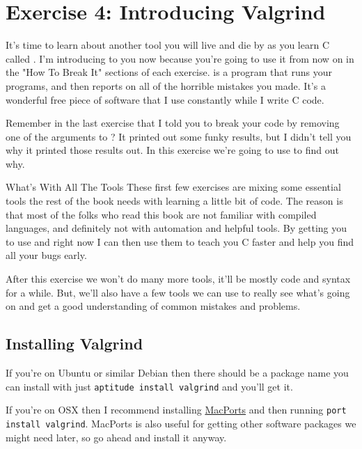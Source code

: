 \chapter{Exercise 4: Introducing Valgrind}

It's time to learn about another tool you will live and die by as you
learn C called .  I'm introducing  to you
now because you're going to use it from now on in the "How To Break It"
sections of each exercise.   is a program that runs your programs,
and then reports on all of the horrible mistakes you made.  It's a wonderful
free piece of software that I use constantly while I write C code.

Remember in the last exercise that I told you to break your code by
removing one of the arguments to ?  It printed out some
funky results, but I didn't tell you why it printed those results out.
In this exercise we're going to use  to find out 
why.

\begin{aside}{What's With All The Tools}
These first few exercises are mixing some essential tools the rest
of the book needs with learning a little bit of code.  The reason is
that most of the folks who read this book are not familiar with compiled
languages, and definitely not with automation and helpful tools.  By 
getting you to use  and  right now I can
then use them to teach you C faster and help you find all your bugs
early.

After this exercise we won't do many more tools, it'll be mostly
code and syntax for a while.  But, we'll also have a few tools we
can use to really see what's going on and get a good understanding
of common mistakes and problems.
\end{aside}

\section{Installing Valgrind}

If you're on Ubuntu or similar Debian then there should be a package
name  you can install with just \verb|aptitude install valgrind|
and you'll get it.

If you're on OSX then I recommend installing \href{http://www.macports.org/}{MacPorts}
and then running \verb|port install valgrind|.  MacPorts is also useful for
getting other software packages we might need later, so go ahead and install 
it anyway.

